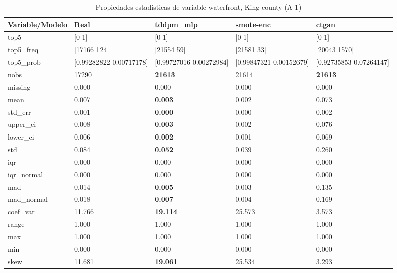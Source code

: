 \begin{table}[H]
\centering
\fontsize{8}{14}\selectfont
\caption{Propiedades  estadisticas de variable waterfront, King county (A-1)}
\label{table-stats-king county-a-1-waterfront}
\begin{tabular}{|l|m{10em}|m{10em}|m{10em}|m{10em}|}
\hline
 \rowcolor[gray]{0.8}
Variable/Modelo & Real & tddpm\_mlp & smote-enc & ctgan \\
\hline top5 & [0 1] & [0 1] & [0 1] & [0 1] \\
\hline top5\_freq & [17166   124] & [21554    59] & [21581    33] & [20043  1570] \\
\hline top5\_prob & [0.99282822 0.00717178] & [0.99727016 0.00272984] & [0.99847321 0.00152679] & [0.92735853 0.07264147] \\
\hline nobs & 17290 & \bfseries 21613 & \cellcolor[rgb]{0.9, 0.54, 0.52} 21614 & \bfseries 21613 \\
\hline missing & 0.000 & 0.000 & 0.000 & 0.000 \\
\hline mean & 0.007 & \bfseries 0.003 & 0.002 & \cellcolor[rgb]{0.9, 0.54, 0.52} 0.073 \\
\hline std\_err & 0.001 & \bfseries 0.000 & 0.000 & \cellcolor[rgb]{0.9, 0.54, 0.52} 0.002 \\
\hline upper\_ci & 0.008 & \bfseries 0.003 & 0.002 & \cellcolor[rgb]{0.9, 0.54, 0.52} 0.076 \\
\hline lower\_ci & 0.006 & \bfseries 0.002 & 0.001 & \cellcolor[rgb]{0.9, 0.54, 0.52} 0.069 \\
\hline std & 0.084 & \bfseries 0.052 & 0.039 & \cellcolor[rgb]{0.9, 0.54, 0.52} 0.260 \\
\hline iqr & 0.000 & 0.000 & 0.000 & 0.000 \\
\hline iqr\_normal & 0.000 & 0.000 & 0.000 & 0.000 \\
\hline mad & 0.014 & \bfseries 0.005 & 0.003 & \cellcolor[rgb]{0.9, 0.54, 0.52} 0.135 \\
\hline mad\_normal & 0.018 & \bfseries 0.007 & 0.004 & \cellcolor[rgb]{0.9, 0.54, 0.52} 0.169 \\
\hline coef\_var & 11.766 & \bfseries 19.114 & \cellcolor[rgb]{0.9, 0.54, 0.52} 25.573 & 3.573 \\
\hline range & 1.000 & 1.000 & 1.000 & 1.000 \\
\hline max & 1.000 & 1.000 & 1.000 & 1.000 \\
\hline min & 0.000 & 0.000 & 0.000 & 0.000 \\
\hline skew & 11.681 & \bfseries 19.061 & \cellcolor[rgb]{0.9, 0.54, 0.52} 25.534 & 3.293 \\

\end{tabular}
\end{table}
